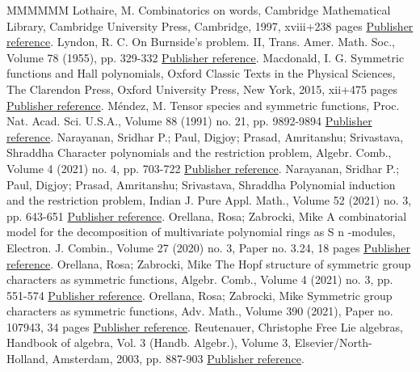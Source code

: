 \begin{thebibliography}{MMMMMM}
 Lothaire, M. Combinatorics on words, Cambridge Mathematical Library, Cambridge University Press, Cambridge, 1997, xviii+238 pages \href{https://alco.centre-mersenne.org/articles/10.5802/alco.365/#MR1475463}{Publisher reference}.
 Lyndon, R. C. On Burnside’s problem. II, Trans. Amer. Math. Soc., Volume 78 (1955), pp. 329-332 \href{https://alco.centre-mersenne.org/articles/10.5802/alco.365/#MR0067884}{Publisher reference}.
 Macdonald, I. G. Symmetric functions and Hall polynomials, Oxford Classic Texts in the Physical Sciences, The Clarendon Press, Oxford University Press, New York, 2015, xii+475 pages \href{https://alco.centre-mersenne.org/articles/10.5802/alco.365/#MR3443860}{Publisher reference}.
 Méndez, M. Tensor species and symmetric functions, Proc. Nat. Acad. Sci. U.S.A., Volume 88 (1991) no. 21, pp. 9892-9894 \href{https://alco.centre-mersenne.org/articles/10.5802/alco.365/#MR1132426}{Publisher reference}.
 Narayanan, Sridhar P.; Paul, Digjoy; Prasad, Amritanshu; Srivastava, Shraddha Character polynomials and the restriction problem, Algebr. Comb., Volume 4 (2021) no. 4, pp. 703-722 \href{https://alco.centre-mersenne.org/articles/10.5802/alco.365/#MR4311085}{Publisher reference}.
 Narayanan, Sridhar P.; Paul, Digjoy; Prasad, Amritanshu; Srivastava, Shraddha Polynomial induction and the restriction problem, Indian J. Pure Appl. Math., Volume 52 (2021) no. 3, pp. 643-651 \href{https://alco.centre-mersenne.org/articles/10.5802/alco.365/#MR4356269}{Publisher reference}.
 Orellana, Rosa; Zabrocki, Mike A combinatorial model for the decomposition of multivariate polynomial rings as S n -modules, Electron. J. Combin., Volume 27 (2020) no. 3, Paper no. 3.24, 18 pages \href{https://alco.centre-mersenne.org/articles/10.5802/alco.365/#MR4245137}{Publisher reference}.
 Orellana, Rosa; Zabrocki, Mike The Hopf structure of symmetric group characters as symmetric functions, Algebr. Comb., Volume 4 (2021) no. 3, pp. 551-574 \href{https://alco.centre-mersenne.org/articles/10.5802/alco.365/#MR4275829}{Publisher reference}.
 Orellana, Rosa; Zabrocki, Mike Symmetric group characters as symmetric functions, Adv. Math., Volume 390 (2021), Paper no. 107943, 34 pages \href{https://alco.centre-mersenne.org/articles/10.5802/alco.365/#MR4295089}{Publisher reference}.
 Reutenauer, Christophe Free Lie algebras, Handbook of algebra, Vol. 3 (Handb. Algebr.), Volume 3, Elsevier/North-Holland, Amsterdam, 2003, pp. 887-903 \href{https://alco.centre-mersenne.org/articles/10.5802/alco.365/#MR2035110}{Publisher reference}.

\end{thebibliography}
